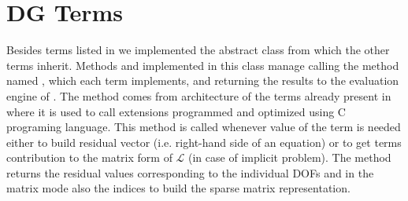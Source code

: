 \section{DG Terms}
Besides terms listed in  we implemented the abstract class 
 from which the other terms inherit. Methods  and 
 implemented in this class manage calling the method named 
, which each term implements, and returning the results to the 
evaluation engine of \sfepy{}. The  method comes from architecture of 
the terms already present in \sfepy{} where it is used to call extensions programmed and 
optimized using C programing language. This method is called whenever value of the term 
is needed either to build residual vector (i.e. right-hand side of an equation) or to get 
terms contribution to the matrix form of $\mathcal{L}$ (in case of implicit problem). The 
method returns the residual values corresponding to the individual DOFs and in the matrix 
mode also the indices to build the sparse matrix representation.

